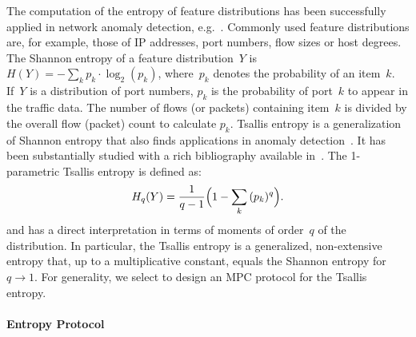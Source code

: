 \documentclass[letterpaper,11pt,onecolumn,titlepage]{article}
\begin{document}
The computation of the entropy of feature distributions has been
successfully applied in network anomaly detection, 
e.g.~\cite{SubspaceMethod05,brauckhoff2009applying,li2006dai,ziviani2007nad}.
Commonly used feature
distributions are, for example, those of IP addresses, port numbers, flow sizes
or host degrees. 
The Shannon entropy of a feature distribution~$Y$ is $H(Y) =
- \sum_{k}{p_k \cdot \log_{2}(p_k) }$, where~$p_k$ denotes the
probability of an item~$k$. If~$Y$ is a distribution of port numbers,
$p_k$ is the probability of port~$k$ to appear in the traffic
data. The number of flows (or packets) containing item~$k$ is divided
by the overall flow (packet) count to calculate $p_k$. Tsallis
entropy is a generalization of Shannon
entropy that also finds applications in anomaly
detection~\cite{ziviani2007nad,tellenbach2009tsallis}. 
It has been substantially studied with a rich bibliography available in~\cite{tsallis}. 
The 1-parametric Tsallis entropy is defined as:
\begin{equation}
H_q(Y) = \frac{1}{q-1} \Bigl( 1- \sum_{k}{(p_k)^q} \Bigr) . \label{eq:tsallis}
\end{equation}
and has a direct interpretation in terms of moments of order~$q$ of
the distribution. In particular,
the Tsallis entropy is a generalized, non-extensive entropy that, up to a multiplicative constant, 
equals the Shannon entropy for \mbox{$q\rightarrow 1$}. 
For generality, we select to design an MPC protocol for the Tsallis entropy.

\paragraph{Entropy Protocol}
\end{document}
